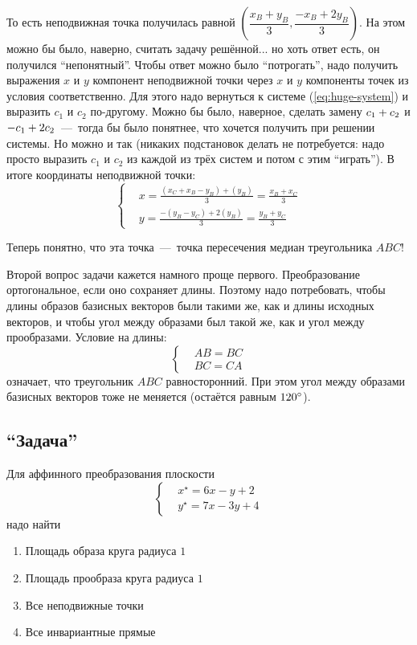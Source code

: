 \documentclass[a4paper,12pt]{article}
\begin{document}
\begin{solution}
    То есть неподвижная точка получилась равной $\left(\dfrac{x_B + y_B}{3}, \dfrac{-x_B + 2y_B}{3}\right)$. На этом можно бы было, наверно, считать задачу решённой... но хоть ответ есть, он получился ``непонятный''.
    Чтобы ответ можно было ``потрогать'', надо получить выражения $x$ и $y$ компонент неподвижной точки через $x$ и $y$ компоненты точек из условия соответственно.
    Для этого надо вернуться к системе (\ref{eq:huge-system}) и выразить $c_1$ и $c_2$ по-другому.
    Можно бы было, наверное, сделать замену $c_1 \hm+ c_2$ и $-c_1 \hm+ 2c_2$~---~тогда бы было понятнее, что хочется получить при решении системы.
    Но можно и так (никаких подстановок делать не потребуется: надо просто выразить $c_1$ и $c_2$ из каждой из трёх систем и потом с этим ``играть'').
    В итоге координаты неподвижной точки:
    \[
      \left\{
        \begin{aligned}
          &x = \frac{(x_C + x_B - y_B) + (y_B)}{3} = \frac{x_B + x_C}{3}\\
          &y = \frac{-(y_B - y_C) + 2(y_B)}{3} = \frac{y_B + y_C}{3}
        \end{aligned}
      \right.
    \]
    
    Теперь понятно, что эта точка~---~точка пересечения медиан треугольника $ABC$!
    
    \bigskip
    
    Второй вопрос задачи кажется намного проще первого.
    Преобразование ортогональное, если оно сохраняет длины.
    Поэтому надо потребовать, чтобы длины образов базисных векторов были такими же, как и длины исходных векторов, и чтобы угол между образами был такой же, как и угол между прообразами.
    Условие на длины:
    \[
      \left\{
        \begin{aligned}
          &AB = BC\\
          &BC = CA
        \end{aligned}
      \right.
    \]
    означает, что треугольник $ABC$ равносторонний.
    При этом угол между образами базисных векторов тоже не меняется (остаётся равным $120\degree$).
  \end{solution}
  
  
  \subsection{``Задача''}
  
  Для аффинного преобразования плоскости
  \[
    \left\{
      \begin{aligned}
        &x^\star = 6x - y + 2\\
        &y^\star = 7x - 3y + 4
      \end{aligned}
    \right.
  \]
  надо найти
  \begin{enumerate}
    \item Площадь образа круга радиуса $1$
    \item Площадь прообраза круга радиуса $1$
    \item Все неподвижные точки
    \item Все инвариантные прямые
  \end{enumerate}
  
\end{document}
